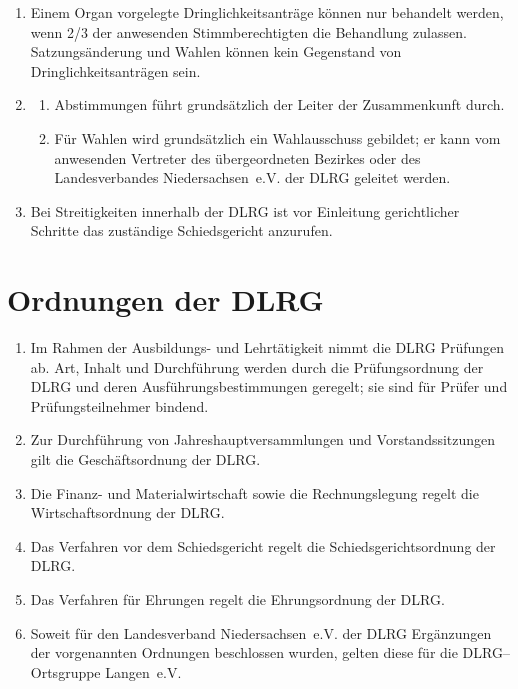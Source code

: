 \documentclass[%
12pt, %
a4paper, %
headsepline, %
parskip, %
headings=normal, %
]{scrreprt}
\begin{document}
\begin{enumerate}
\begin{enumerate}[noitemsep]
        \item Sonstige Beschlüsse der Jahreshauptversammlung und des Vorstandes werden, soweit diese Satzung nichts anderes vorschreibt, mit einfacher Mehrheit der abgegebenen Stimmen gefasst. Stimmenthaltungen und ungültige Stimmen werden nicht mitgezählt. Bei Stimmengleichheit gilt ein Antrag als abgelehnt.\\
          Abstimmungen erfolgen offen, soweit nicht geheime Abstimmung beschlossen wird.
      \end{enumerate}
    \item Einem Organ vorgelegte Dringlichkeitsanträge können nur behandelt werden, wenn 2/3 der anwesenden Stimmberechtigten die Behandlung zulassen. Satzungsänderung und Wahlen können kein Gegenstand von Dringlichkeitsanträgen sein.
    \item \begin{enumerate}[noitemsep]
        \item Abstimmungen führt grundsätzlich der Leiter der Zusammenkunft durch.
        \item Für Wahlen wird grundsätzlich ein Wahlausschuss gebildet; er kann vom anwesenden Vertreter des übergeordneten Bezirkes oder des Landesverbandes Niedersachsen~e.V. der DLRG geleitet werden.
      \end{enumerate}
    \item Bei Streitigkeiten innerhalb der DLRG ist vor Einleitung gerichtlicher Schritte das zuständige Schiedsgericht anzurufen.
\end{enumerate}

\section{Ordnungen der DLRG}
\label{sec:ordnungen}
\begin{enumerate}
    \item Im Rahmen der Ausbildungs- und Lehrtätigkeit nimmt die DLRG Prüfungen ab. Art, Inhalt und Durchführung werden durch die Prüfungsordnung der DLRG und deren Ausführungsbestimmungen geregelt; sie sind für Prüfer und Prüfungsteilnehmer bindend.
    \item Zur Durchführung von Jahreshauptversammlungen und Vorstandssitzungen gilt die Geschäftsordnung der DLRG.
    \item Die Finanz- und Materialwirtschaft sowie die Rechnungslegung regelt die Wirtschaftsordnung der DLRG.
    \item Das Verfahren vor dem Schiedsgericht regelt die Schiedsgerichtsordnung der DLRG.
    \item Das Verfahren für Ehrungen regelt die Ehrungsordnung der DLRG.
    \item Soweit für den Landesverband Niedersachsen~e.V. der DLRG Ergänzungen der vorgenannten Ordnungen beschlossen wurden, gelten diese für die DLRG--Ortsgruppe Langen~e.V.
\end{enumerate}
\end{document}
